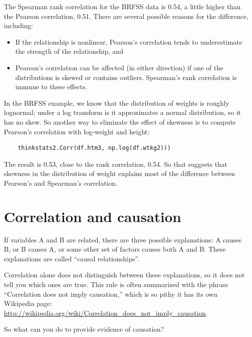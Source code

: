 \documentclass[12pt]{book}
\begin{document}
The Spearman rank correlation for the BRFSS data is 0.54, a little
higher than the Pearson correlation, 0.51.  There are several possible
reasons for the difference, including:

\begin{itemize}

\item If the relationship is
nonlinear, Pearson's correlation tends to underestimate the strength
of the relationship, and 

\item Pearson's correlation can be affected (in either direction)
if one of the distributions is skewed or contains outliers.  Spearman's
rank correlation is immune to these effects.

\end{itemize}

In the BRFSS example, we know that the distribution of weights is
roughly lognormal; under a log transform is it approximates a normal
distribution, so it has no skew.
So another way to eliminate the effect of skewness is to
compute Pearson's
correlation with log-weight and height:

\begin{verbatim}
    thinkstats2.Corr(df.htm3, np.log(df.wtkg2)))
\end{verbatim}

The result is 0.53, close to the rank correlation, 0.54.  So that
suggests that skewness in the distribution of weight explains most of
the difference between Pearson's and Spearman's correlation.


\section{Correlation and causation}

If variables A and B are related, there are three possible
explanations: A causes B, or B causes A, or some other set of factors
causes both A and B.  These explanations are called ``causal
relationships''.

Correlation alone does not distinguish between these explanations,
so it does not tell you which ones are true.
This rule is often summarized with the phrase ``Correlation
does not imply causation,'' which is so pithy it has its own
Wikipedia page: \url{http://wikipedia.org/wiki/Correlation_does_not_imply_causation}.

So what can you do to provide evidence of causation?
\end{document}
